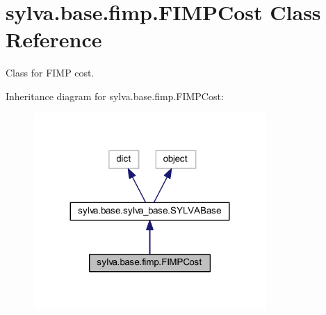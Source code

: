 \hypertarget{classsylva_1_1base_1_1fimp_1_1_f_i_m_p_cost}{}\section{sylva.\+base.\+fimp.\+F\+I\+M\+P\+Cost Class Reference}
\label{classsylva_1_1base_1_1fimp_1_1_f_i_m_p_cost}


Class for F\+I\+MP cost.  




Inheritance diagram for sylva.\+base.\+fimp.\+F\+I\+M\+P\+Cost\+:\nopagebreak
\begin{figure}[H]
\begin{center}
\leavevmode
\includegraphics[width=251pt]{classsylva_1_1base_1_1fimp_1_1_f_i_m_p_cost__inherit__graph}
\end{center}
\end{figure}
